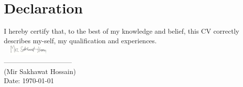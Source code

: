 \documentclass[a4paper]{twentysecondcv} %
\begin{document}
\section{Declaration}


I hereby certify that, to the best of my knowledge and belief, this CV correctly\\ describes my-self, my qualification and experiences.\\

\includegraphics[height=20px,width=100px]{signature.jpg}\\
------------------------------\\
(Mir Sakhawat Hossain)\\
Date: \today


\end{document}
